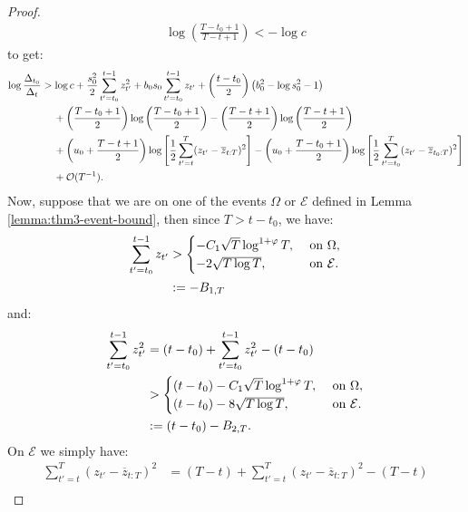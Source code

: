 \begin{proof}
\begin{align*}
    \log \left(\frac{T - t_0 + 1}{T - t+1} \right) < -\log c
\end{align*}
to get: 
\begin{align}
    \log \frac{\Delta_{t_0}}{\Delta_t} &> \log c + \frac{s_0^2}{2} \sum_{t' = t_0}^{t - 1} z_{t'}^2 + b_0 s_0 \sum_{t' = t_0}^{t - 1} z_{t'} + \left(\frac{t-t_0}{2}\right)\left(b_0^2 - \log s_0^2 - 1\right) \notag \\
    &\quad\: + \left(\frac{T - t_0+1}{2}\right) \log\left(\frac{T-t_0+1}{2}\right) - \left(\frac{T - t+1}{2}\right) \log\left(\frac{T-t+1}{2}\right) \notag\\
    &\quad\: + \left(u_0 + \frac{T - t +1}{2}\right)\log\left[ \frac{1}{2}\sum_{t'=t}^T (z_{t'} - \overline{z}_{t:T})^2 \right]  - \left(u_0 + \frac{T - t_0 +1}{2}\right)\log\left[\frac{1}{2}\sum_{t'=t_0}^T (z_{t'} - \overline{z}_{t_0:T})^2 \right] \notag\\
    &\quad\: + \mathcal{O}(T^{-1}). \label{eq:thm3-cs1-bd1}
\end{align}
Now, suppose that we are on one of the events $\Omega$ or $\mathcal{E}$ defined in Lemma \ref{lemma:thm3-event-bound}, then since $T > t - t_0$, we have:
\begin{align}
    \sum_{t' = t_0}^{t - 1} z_{t'} &> 
    \begin{cases}
        - C_1 \sqrt{T}\log^{1+\varphi} T, & \text{ on } \Omega, \\ 
        - 2 \sqrt{T\log T}, &\text{ on } \mathcal{E}.
    \end{cases} \notag \\
    &:= -B_{1,T} \label{eq:thm3-cs1-bd2}
\end{align}
and:
\begin{align}
    \sum_{t' = t_0}^{t - 1} z_{t'}^2 &= (t-t_0) + \sum_{t' = t_0}^{t - 1} z_{t'}^2 - (t-t_0) \\
    &>
    \begin{cases}
        (t-t_0) - C_1 \sqrt{T}\log^{1+\varphi} T, & \text{ on } \Omega, \\ 
        (t-t_0) - 8 \sqrt{T\log T}, &\text{ on } \mathcal{E}.
    \end{cases} \notag \\
    &:= (t-t_0) - B_{2,T}.
\end{align}
On $\mathcal{E}$ we simply have:
\begin{align*}
    \sum_{t'=t}^T (z_{t'} - \overline{z}_{t:T})^2 &= (T-t)+ \sum_{t'=t}^T (z_{t'} - \overline{z}_{t:T})^2 - (T-t) \\

\end{align*}
\end{proof}
